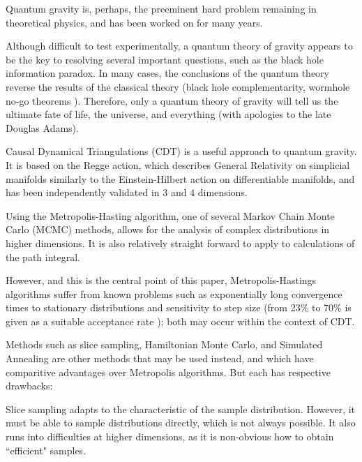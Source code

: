 \documentclass[12pt]{article}
\begin{document}
Quantum gravity is, perhaps, the preeminent hard problem\cite{steve_carlip_why_2014} remaining in theoretical physics, and has been worked on for many years\cite{rovelli_notes_2000}.

Although difficult to test experimentally, a quantum theory of gravity appears to be the key to resolving several important
questions, such as the black hole information paradox.\cite{preskill_black_1992} In many cases, the conclusions of the quantum theory reverse the results of the classical theory
(black hole complementarity\cite{almheiri_black_2013}, wormhole no-go theorems \cite{visser_lorentzian_1996}). Therefore, only a quantum theory of gravity will tell us the ultimate fate of life, the universe, and everything (with apologies to the
late Douglas Adams).\cite{adams_life_1997}

Causal Dynamical Triangulations (CDT) \cite{ambjorn_non-perturbative_2000,j._ambjorn_dynamically_2001,loll_discrete_2003,ambjorn_quantum_2013,cooperman_making_2014} is a useful
approach to quantum gravity. It is based on the Regge action\cite{regge_general_1961}, which describes General Relativity on simplicial manifolds similarly to the Einstein-Hilbert
action on differentiable manifolds, and has been independently validated in 3 and 4 dimensions.\cite{kommu_validation_2011}

Using the Metropolis-Hasting algorithm\cite{robert_metropolis-hastings_2015}, one of several Markov Chain Monte Carlo (MCMC) methods, allows
for the analysis of complex distributions in higher dimensions.\cite{grisins_metropolishastings_2014} It is also relatively straight forward to apply to calculations
of the path integral.

However, and this is the central point of this paper, Metropolis-Hastings algorithms suffer from known problems such as exponentially long convergence times to stationary distributions and sensitivity to step size (from 23\% to 70\% is given as a suitable acceptance rate \cite{bedard_optimal_2008,xing_markov_nodate}); both may occur within the context of CDT.

Methods such as slice sampling, Hamiltonian Monte Carlo, and Simulated Annealing are other methods that may be used instead, and which have comparitive advantages over Metropolis algorithms. But each has respective drawbacks:

Slice sampling \cite{neal_slice_2003} adapts to the characteristic of the sample distribution. However, it must be able to sample distributions directly, which is not always possible. It also runs into difficulties at higher dimensions, as it is non-obvious how to obtain ``efficient" samples.
\end{document}
